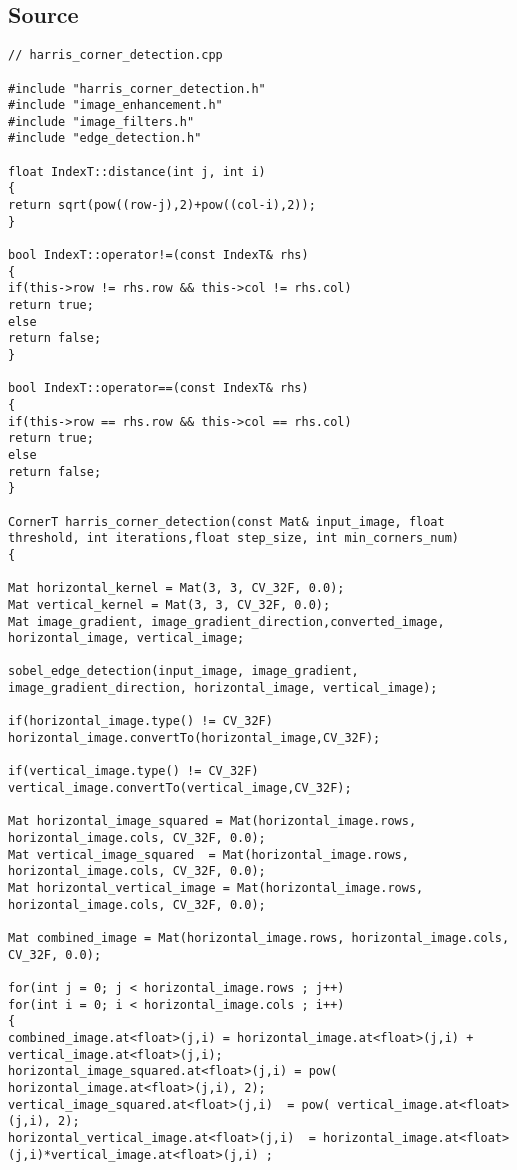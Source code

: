 \subsection{Source}
\begin{lstlisting}
// harris_corner_detection.cpp

#include "harris_corner_detection.h"
#include "image_enhancement.h"
#include "image_filters.h"
#include "edge_detection.h"

float IndexT::distance(int j, int i)
{	
return sqrt(pow((row-j),2)+pow((col-i),2));
}

bool IndexT::operator!=(const IndexT& rhs)
{
if(this->row != rhs.row && this->col != rhs.col)
return true;
else
return false;
}

bool IndexT::operator==(const IndexT& rhs)
{
if(this->row == rhs.row && this->col == rhs.col)
return true;
else
return false;
}

CornerT harris_corner_detection(const Mat& input_image, float threshold, int iterations,float step_size, int min_corners_num)
{

Mat horizontal_kernel = Mat(3, 3, CV_32F, 0.0);
Mat vertical_kernel = Mat(3, 3, CV_32F, 0.0);
Mat image_gradient, image_gradient_direction,converted_image, horizontal_image, vertical_image;

sobel_edge_detection(input_image, image_gradient, image_gradient_direction, horizontal_image, vertical_image);

if(horizontal_image.type() != CV_32F)
horizontal_image.convertTo(horizontal_image,CV_32F);

if(vertical_image.type() != CV_32F)
vertical_image.convertTo(vertical_image,CV_32F);

Mat horizontal_image_squared = Mat(horizontal_image.rows, horizontal_image.cols, CV_32F, 0.0);
Mat vertical_image_squared  = Mat(horizontal_image.rows, horizontal_image.cols, CV_32F, 0.0);
Mat horizontal_vertical_image = Mat(horizontal_image.rows, horizontal_image.cols, CV_32F, 0.0);

Mat combined_image = Mat(horizontal_image.rows, horizontal_image.cols, CV_32F, 0.0);

for(int j = 0; j < horizontal_image.rows ; j++)
for(int i = 0; i < horizontal_image.cols ; i++)
{
combined_image.at<float>(j,i) = horizontal_image.at<float>(j,i) + vertical_image.at<float>(j,i);
horizontal_image_squared.at<float>(j,i) = pow( horizontal_image.at<float>(j,i), 2);
vertical_image_squared.at<float>(j,i)  = pow( vertical_image.at<float>(j,i), 2);
horizontal_vertical_image.at<float>(j,i)  = horizontal_image.at<float>(j,i)*vertical_image.at<float>(j,i) ;


\end{lstlisting}

